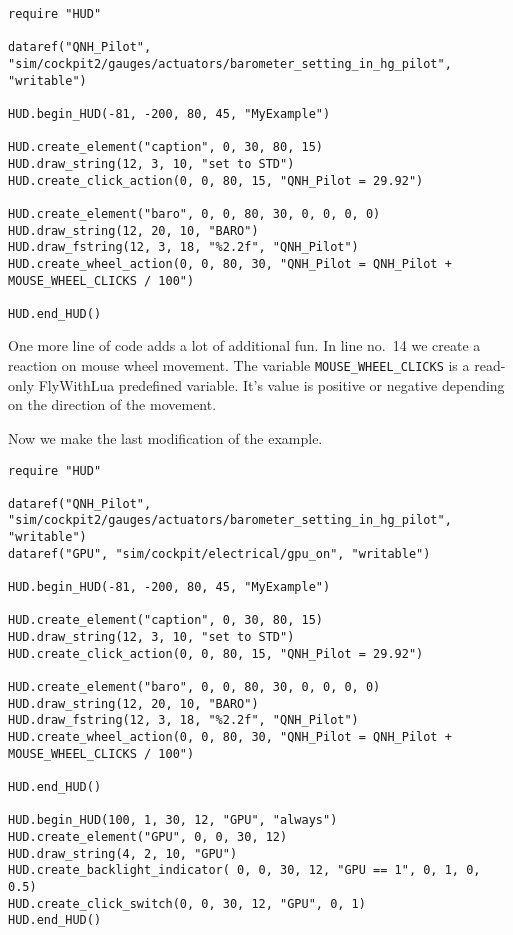 \documentclass[11pt,parskip=half,a4paper]{scrartcl}
\begin{document}
\begin{lstlisting}[firstnumber=1]
require "HUD"

dataref("QNH_Pilot", "sim/cockpit2/gauges/actuators/barometer_setting_in_hg_pilot", "writable")

HUD.begin_HUD(-81, -200, 80, 45, "MyExample")

HUD.create_element("caption", 0, 30, 80, 15)
HUD.draw_string(12, 3, 10, "set to STD")
HUD.create_click_action(0, 0, 80, 15, "QNH_Pilot = 29.92")

HUD.create_element("baro", 0, 0, 80, 30, 0, 0, 0, 0)
HUD.draw_string(12, 20, 10, "BARO")
HUD.draw_fstring(12, 3, 18, "%2.2f", "QNH_Pilot")
HUD.create_wheel_action(0, 0, 80, 30, "QNH_Pilot = QNH_Pilot + MOUSE_WHEEL_CLICKS / 100")

HUD.end_HUD()
\end{lstlisting}

One more line of code adds a lot of additional fun. In line no.~14 we create a reaction on mouse wheel movement. The variable \verb|MOUSE_WHEEL_CLICKS| is a read-only FlyWithLua predefined variable. It's value is positive or negative depending on the direction of the movement.

Now we make the last modification of the example.

\begin{lstlisting}[firstnumber=1]
require "HUD"

dataref("QNH_Pilot", "sim/cockpit2/gauges/actuators/barometer_setting_in_hg_pilot", "writable")
dataref("GPU", "sim/cockpit/electrical/gpu_on", "writable")

HUD.begin_HUD(-81, -200, 80, 45, "MyExample")

HUD.create_element("caption", 0, 30, 80, 15)
HUD.draw_string(12, 3, 10, "set to STD")
HUD.create_click_action(0, 0, 80, 15, "QNH_Pilot = 29.92")

HUD.create_element("baro", 0, 0, 80, 30, 0, 0, 0, 0)
HUD.draw_string(12, 20, 10, "BARO")
HUD.draw_fstring(12, 3, 18, "%2.2f", "QNH_Pilot")
HUD.create_wheel_action(0, 0, 80, 30, "QNH_Pilot = QNH_Pilot + MOUSE_WHEEL_CLICKS / 100")

HUD.end_HUD()

HUD.begin_HUD(100, 1, 30, 12, "GPU", "always")
HUD.create_element("GPU", 0, 0, 30, 12)
HUD.draw_string(4, 2, 10, "GPU")
HUD.create_backlight_indicator( 0, 0, 30, 12, "GPU == 1", 0, 1, 0, 0.5)
HUD.create_click_switch(0, 0, 30, 12, "GPU", 0, 1)
HUD.end_HUD()
\end{lstlisting}
\end{document}
